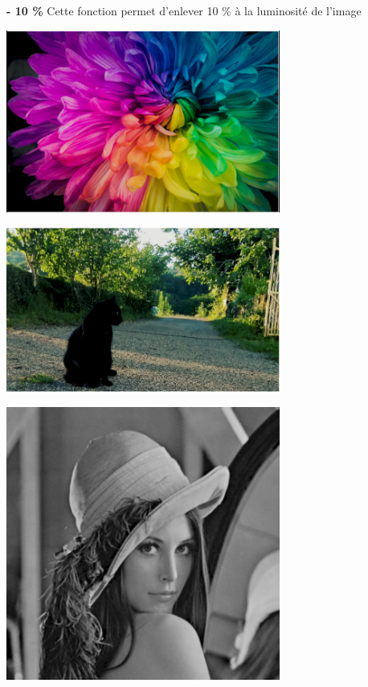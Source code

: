 \documentclass{article}
\begin{document}
\textbf{- 10 \%}
Cette fonction permet d'enlever 10 \% à la luminosité de l'image

\begin{center} 
    \includegraphics[width=9cm]{../Image_fonctions/Multicolor/Brightness-1.PNG}
\end{center}
\begin{center} 
    \includegraphics[width=9cm]{../Image_fonctions/Cat/Brightness-1.PNG}
\end{center}
\begin{center} 
    \includegraphics[width=9cm]{../Image_fonctions/Lenna/Brightness-1.PNG}
\end{center}
\end{document}
